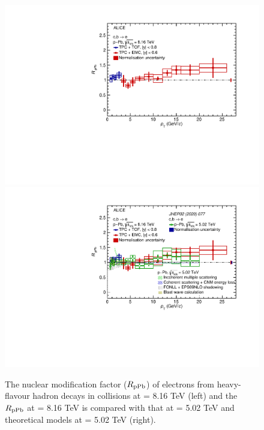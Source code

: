 \begin{figure}[!ht]
      \begin{center}
      \includegraphics[width=0.48\linewidth]{figures/Results/HFE_pPb/RpPb_8TeV.pdf}
      \includegraphics[width=0.48\linewidth]{figures/Results/HFE_pPb/RpPb_8TeV_ComparedWith5TeV.pdf}
      \end{center}
\caption{The nuclear modification factor ($R_{\rm{pPb}}$) of electrons from heavy-flavour hadron decays in \pPb collisions at \sqrtsNN = 8.16 TeV (left) and the $R_{\rm{pPb}}$ at \sqrtsNN = 8.16 TeV is compared with that at \sqrtsNN = 5.02 TeV and theoretical models at \sqrtsNN = 5.02 TeV (right).}    
\label{Fig:RpPb}
\end{figure}

